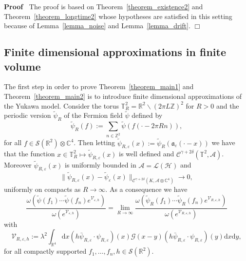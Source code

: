 \documentclass{article}
\newcommand{\assign}{:=}
\newcommand{\mathd}{\mathrm{d}}
\newenvironment{proof}{\noindent\textbf{Proof\ }}{\hspace*{\fill}$\Box$\medskip}
\begin{document}
\begin{proof}
  The proof is based on Theorem~\ref{theorem_existence2} and
  Theorem~\ref{theorem_longtime2} whose hypotheses are satisfied in this
  setting because of Lemma~\ref{lemma_noise} and Lemma~\ref{lemma_drift}.
\end{proof}

\subsection{Finite dimensional approximations in finite volume}

The first step in order to prove Theorem~\ref{theorem_main1} and
Theorem~\ref{theorem_main2} is to introduce finite dimensional approximations
of the Yukawa model. Consider the torus $\mathbb{T}_R^2 =\mathbb{R}^2
\backslash (2 \pi L\mathbb{Z})^2$ for $R > 0$ and the periodic version
$\tilde{\psi}_R$ of the Fermion field $\tilde{\psi}$ defined by
\[ \tilde{\psi}_R (f) \assign \sum_{n \in \mathbb{Z}^2} \tilde{\psi} (f (\cdot
   - 2 \pi R n)), \]
for all $f \in \mathcal{S} (\mathbb{R}^2) \otimes \mathbb{C}^4$. Then letting
$\tilde{\psi}_{R, \varepsilon} (x) \assign \tilde{\psi}_R
(\mathfrak{a}_{\varepsilon} (\cdot - x))$ we have that the function $x \in
\mathbb{T}^2_R \mapsto \tilde{\psi}_{R, \varepsilon} (x)$ is well defined and
$\mathcal{C}^{\gamma + 2 \delta} (\mathbb{T}^2, \mathcal{A})$. Moreover
$\tilde{\psi}_{R, \varepsilon} (x)$ is uniformly bounded in $\mathcal{A} =
\mathcal{L} (\mathcal{H})$ and
\[ \| \tilde{\psi}_{R, \varepsilon} (x) - \tilde{\psi}_{\varepsilon} (x)
   \|_{\mathcal{C}^{\gamma + 2 \delta} (K, \mathcal{A} \otimes \mathbb{C}^4)}
   \rightarrow 0, \]
uniformly on compacts as $R \rightarrow \infty$. As a consequence we have
\begin{equation}
  \frac{\omega (\tilde{\psi} (f_1) \cdots \tilde{\psi} (f_n)
  e^{\mathcal{V}_{\varepsilon, h}})}{\omega (e^{\mathcal{V}_{\varepsilon,
  h}})} = \lim_{R \rightarrow \infty} \frac{\omega (\tilde{\psi}_R (f_1)
  \cdots \tilde{\psi}_R (f_n) e^{\mathcal{V}_{R, \varepsilon, h}})}{\omega
  (e^{\mathcal{V}_{R, \varepsilon, h}})}
  \label{eq:euclidean-yukawa-fermion-periodic}
\end{equation}
with
\[ \mathcal{V}_{R, \varepsilon, h} \assign \lambda^2 \int_{\mathbb{R}^4}
   \mathd x (h \bar{\psi}_{R, \varepsilon} \cdot \psi_{R, \varepsilon}) (x)
   \mathcal{G} (x - y) (h \bar{\psi}_{R, \varepsilon} \cdot \psi_{R,
   \varepsilon}) (y) \mathd x \mathd y, \]
for all compactly supported $f_1, \ldots, f_n, h \in \mathcal{S}
(\mathbb{R}^2)$.
\end{document}

